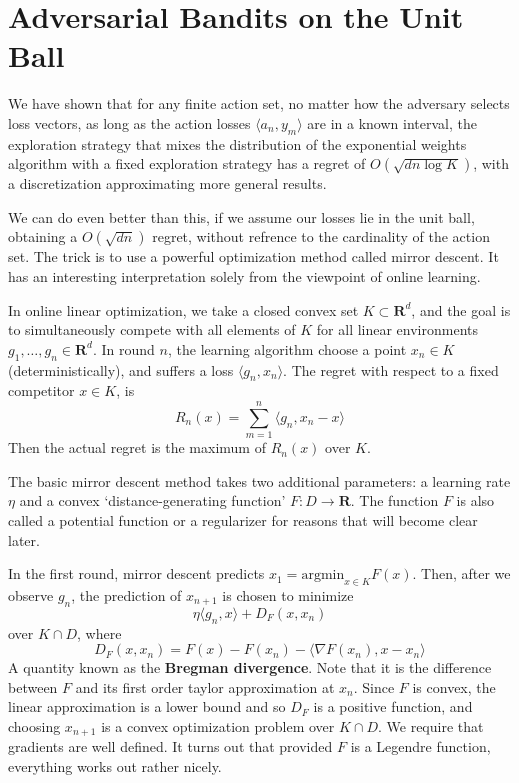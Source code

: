 \section{Adversarial Bandits on the Unit Ball}

We have shown that for any finite action set, no matter how the adversary selects loss vectors, as long as the action losses $\langle a_n, y_m \rangle$ are in a known interval, the exploration strategy that mixes the distribution of the exponential weights algorithm with a fixed exploration strategy has a regret of $O(\sqrt{dn \log K})$, with a discretization approximating more general results.

We can do even better than this, if we assume our losses lie in the unit ball, obtaining a $O(\sqrt{dn})$ regret, without refrence to the cardinality of the action set. The trick is to use a powerful optimization method called mirror descent. It has an interesting interpretation solely from the viewpoint of online learning.

In online linear optimization, we take a closed convex set $K \subset \mathbf{R}^d$, and the goal is to simultaneously compete with all elements of $K$ for all linear environments $g_1, \dots, g_n \in \mathbf{R}^d$. In round $n$, the learning algorithm choose a point $x_n \in K$ (deterministically), and suffers a loss $\langle g_n, x_n \rangle$. The regret with respect to a fixed competitor $x \in K$, is
%
\[ R_n(x) = \sum_{m = 1}^n \langle g_n, x_n - x \rangle \]
%
Then the actual regret is the maximum of $R_n(x)$ over $K$.

The basic mirror descent method takes two additional parameters: a learning rate $\eta$ and a convex `distance-generating function' $F: D \to \mathbf{R}$. The function $F$ is also called a potential function or a regularizer for reasons that will become clear later.

In the first round, mirror descent predicts $x_1 = \text{argmin}_{x \in K} F(x)$. Then, after we observe $g_n$, the prediction of $x_{n+1}$ is chosen to minimize
%
\[ \eta \langle g_n, x \rangle + D_F(x,x_n) \]
%
over $K \cap D$, where
%
\[ D_F(x,x_n) = F(x) - F(x_n) - \langle \nabla F(x_n), x - x_n \rangle \]
%
A quantity known as the {\bf Bregman divergence}. Note that it is the difference between $F$ and its first order taylor approximation at $x_n$. Since $F$ is convex, the linear approximation is a lower bound and so $D_F$ is a positive function, and choosing $x_{n+1}$ is a convex optimization problem over $K \cap D$. We require that gradients are well defined. It turns out that provided $F$ is a Legendre function, everything works out rather nicely.

